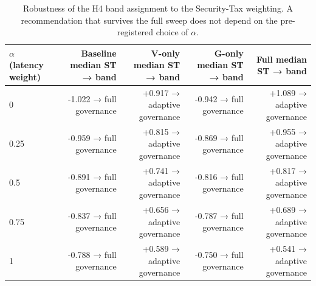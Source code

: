 \begin{table}[htbp]
\centering
\small
\caption{Robustness of the H4 band assignment to the Security-Tax weighting. A recommendation that survives the full sweep does not depend on the pre-registered choice of $\alpha$.}
\label{tab:gmais-7}
\begin{tabular}{lrrrr}
\toprule
$\alpha$ (latency weight) & Baseline median ST → band & V-only median ST → band & G-only median ST → band & Full median ST → band \\
\midrule
0 & -1.022 → full governance & +0.917 → adaptive governance & -0.942 → full governance & +1.089 → adaptive governance \\
0.25 & -0.959 → full governance & +0.815 → adaptive governance & -0.869 → full governance & +0.955 → adaptive governance \\
0.5 & -0.891 → full governance & +0.741 → adaptive governance & -0.816 → full governance & +0.817 → adaptive governance \\
0.75 & -0.837 → full governance & +0.656 → adaptive governance & -0.787 → full governance & +0.689 → adaptive governance \\
1 & -0.788 → full governance & +0.589 → adaptive governance & -0.750 → full governance & +0.541 → adaptive governance \\
\bottomrule
\end{tabular}
\end{table}
